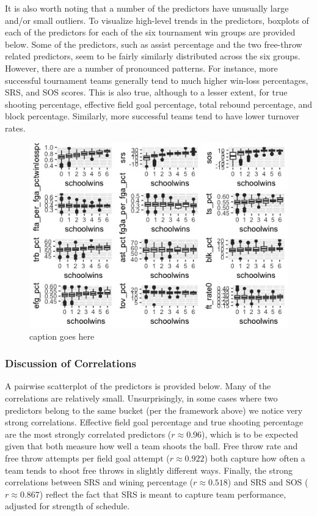 \documentclass[10pt,a4paper, hidelinks]{article} %
\begin{document}
It is also worth noting that a number of the predictors have unusually large and/or small outliers. To visualize high-level trends in the predictors, boxplots of each of the predictors for each of the six tournament win groups are provided below. Some of the predictors, such as assist percentage and the two free-throw related predictors, seem to be fairly similarly distributed across the six groups. However, there are a number of pronounced patterns. For instance, more successful tournament teams generally tend to much higher win-loss percentages, SRS, and SOS scores. This is also true, although to a lesser extent, for true shooting percentage, effective field goal percentage, total rebound percentage, and block percentage. Similarly, more successful teams tend to have lower turnover rates. 

\begin{figure}[H]
	\centering
	\includegraphics[width=1\linewidth]{../fig/RayleighWetDream}
	\caption{caption goes here}
	\label{fig:rayleighwetdream}
\end{figure}

\subsubsection{Discussion of Correlations}

A pairwise scatterplot of the predictors is provided below. Many of the correlations are relatively small. Unsurprisingly, in some cases where two predictors belong to the same bucket (per the framework above) we notice very strong correlations. Effective field goal percentage and true shooting percentage are the most strongly correlated predictors ($r \approx 0.96$), which is to be expected given that both measure how well a team shoots the ball. Free throw rate and free throw attempts per field goal attempt ($r \approx 0.922$) both capture how often a team tends to shoot free throws in slightly different ways. Finally, the strong correlations between SRS and wining percentage ($r \approx 0.518$) and SRS and SOS ($r \approx 0.867$) reflect the fact that SRS is meant to capture team performance, adjusted for strength of schedule.
\end{document}
